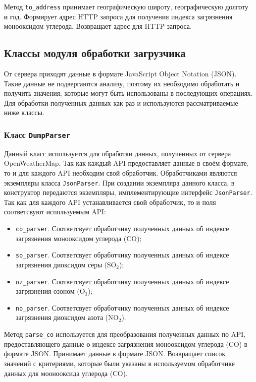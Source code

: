 Метод \texttt{to\_address} принимает географическую широту, географическую долготу и год.
Формирует адрес HTTP запроса для получения индекса загрязнения монооксидом углерода.
Возвращает адрес для HTTP запроса.




\subsection{Классы модуля обработки загрузчика}
От сервера приходят данные в формате JavaScript Object Notation (JSON).
Такие данные не подвергаются анализу, поэтому их необходимо обработать и получить значения, которые могут быть использованы в последующих операциях.
Для обработки полученных данных как раз и используются рассматриваемые ниже классы.

\subsubsection{Класс \texttt{DumpParser}}
Данный класс используется для обработки данных, полученных от сервера OpenWeatherMap.
Так как каждый API предоставляет данные в своём формате, то и для каждого API необходим свой обработчик.
Обработчиками являются экземпляры класса \texttt{JsonParser}.
При создании экземпляра данного класса, в конструктор передаются экземпляры, имплементирующие интерфейс \texttt{JsonParser}.
Так как для каждого API устанавливается свой обработчик, то и поля соответсвуют используемым API:
\begin{itemize}
    \item \texttt{co\_parser}. Соответсвует обработчику полученных данных об индексе загрязнения монооксидом углерода ($ \text{CO} $);
    \item \texttt{so\_parser}. Соответсвует обработчику полученных данных об индексе загрязнения диоксидом серы ($ \text{SO}_{\text{2}} $);
    \item \texttt{oz\_parser}. Соответсвует обработчику полученных данных об индексе загрязнения озоном ($ \text{O}_{\text{3}} $);
    \item \texttt{no\_parser}. Соответсвует обработчику полученных данных об индексе загрязнения диоксидом азота ($ \text{NO}_{\text{2}} $).
\end{itemize}

Метод \texttt{parse\_co} используется для преобразования полученных данных по API, предоставляющего данные о индексе загрязнения монооксидом углерода ($ \text{CO} $) в формате JSON.
Принимает данные в формате JSON.
Возвращает список значений с критериями, которые были указаны в используемом обработчике данных для моонооксида углерода ($ \text{CO} $).


